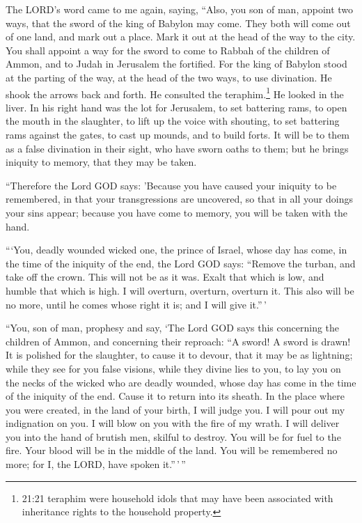  The LORD's word came to me again, saying, 
``Also, you son of man, appoint two ways, that the sword of the king of
Babylon may come. They both will come out of one land, and mark out a
place. Mark it out at the head of the way to the city.  You
shall appoint a way for the sword to come to Rabbah of the children of
Ammon, and to Judah in Jerusalem the fortified.  For the
king of Babylon stood at the parting of the way, at the head of the two
ways, to use divination. He shook the arrows back and forth. He
consulted the teraphim.\footnote{21:21 teraphim were household idols
  that may have been associated with inheritance rights to the household
  property.} He looked in the liver.  In his right hand was
the lot for Jerusalem, to set battering rams, to open the mouth in the
slaughter, to lift up the voice with shouting, to set battering rams
against the gates, to cast up mounds, and to build forts. 
It will be to them as a false divination in their sight, who have sworn
oaths to them; but he brings iniquity to memory, that they may be taken.

 ``Therefore the Lord GOD says: 'Because you have caused
your iniquity to be remembered, in that your transgressions are
uncovered, so that in all your doings your sins appear; because you have
come to memory, you will be taken with the hand.

 ```You, deadly wounded wicked one, the prince of Israel,
whose day has come, in the time of the iniquity of the end,
 the Lord GOD says: ``Remove the turban, and take off the
crown. This will not be as it was. Exalt that which is low, and humble
that which is high.  I will overturn, overturn, overturn
it. This also will be no more, until he comes whose right it is; and I
will give it.''\,'

 ``You, son of man, prophesy and say, `The Lord GOD says
this concerning the children of Ammon, and concerning their reproach:
``A sword! A sword is drawn! It is polished for the slaughter, to cause
it to devour, that it may be as lightning;  while they see
for you false visions, while they divine lies to you, to lay you on the
necks of the wicked who are deadly wounded, whose day has come in the
time of the iniquity of the end.  Cause it to return into
its sheath. In the place where you were created, in the land of your
birth, I will judge you.  I will pour out my indignation on
you. I will blow on you with the fire of my wrath. I will deliver you
into the hand of brutish men, skilful to destroy.  You will
be for fuel to the fire. Your blood will be in the middle of the land.
You will be remembered no more; for I, the LORD, have spoken
it.''\,'\,''

